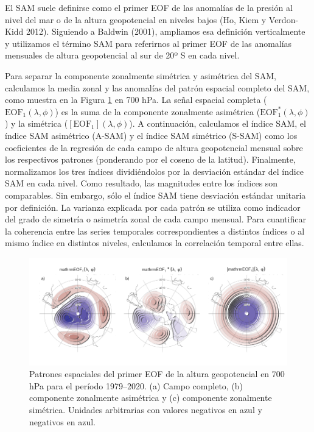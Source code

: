 \documentclass[12pt,oneside,a4paper]{reedthesis}
\begin{document}
El SAM suele definirse como el primer EOF de las anomalías de la presión al nivel del mar o de la altura geopotencial en niveles bajos (Ho, Kiem y Verdon-Kidd 2012).
Siguiendo a Baldwin (2001), ampliamos esa definición verticalmente y utilizamos el término SAM para referirnos al primer EOF de las anomalías mensuales de altura geopotencial al sur de 20º S en cada nivel.

Para separar la componente zonalmente simétrica y asimétrica del SAM, calculamos la media zonal y las anomalías del patrón espacial completo del SAM, como muestra en la Figura \ref{fig:method} en 700 hPa.
La señal espacial completa (\(\mathrm{EOF_1}(\lambda, \phi)\)) es la suma de la componente zonalmente asimétrica (\(\mathrm{EOF_1^*}(\lambda, \phi)\)) y la simétrica (\([\mathrm{EOF_1}](\lambda, \phi)\)).
A continuación, calculamos el índice SAM, el índice SAM asimétrico (A-SAM) y el índice SAM simétrico (S-SAM) como los coeficientes de la regresión de cada campo de altura geopotencial mensual sobre los respectivos patrones (ponderando por el coseno de la latitud).
Finalmente, normalizamos los tres índices dividiéndolos por la desviación estándar del índice SAM en cada nivel.
Como resultado, las magnitudes entre los índices son comparables.
Sin embargo, sólo el índice SAM tiene desviación estándar unitaria por definición.
La varianza explicada por cada patrón se utiliza como indicador del grado de simetría o asimetría zonal de cada campo mensual.
Para cuantificar la coherencia entre las series temporales correspondientes a distintos índices o al mismo índice en distintos niveles, calculamos la correlación temporal entre ellas.



\begin{figure}

{\centering \includegraphics{figures/30-sam/method-1} 

}

\caption{Patrones espaciales del primer EOF de la altura geopotencial en 700 hPa para el período 1979--2020. (a) Campo completo, (b) componente zonalmente asimétrica y (c) componente zonalmente simétrica. Unidades arbitrarias con valores negativos en azul y negativos en azul.}\label{fig:method}
\end{figure}
\end{document}
